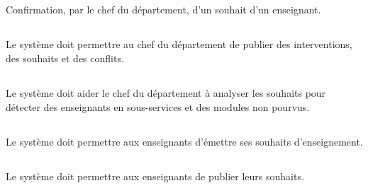 

\subsection{}
\begin{requirement}[Affectation]
	Confirmation, par le chef du département, d'un souhait d'un enseignant.
\end{requirement}

\subsection{}
\begin{requirement}
	Le système doit permettre au chef du département de publier des interventions, des souhaits et des conflits.
\end{requirement}

\subsection{}
\begin{requirement}[Analyse]
	Le système doit aider le chef du département à analyser les souhaits pour détecter des enseignants en sous-services et des modules non pourvus. 
\end{requirement}

\subsection{}
\begin{requirement}
	Le système doit permettre aux enseignants d'émettre ses souhaits d'enseignement.
\end{requirement}

\subsection{}
\begin{requirement}
	Le système doit permettre aux enseignants de publier leurs souhaits.
\end{requirement}


